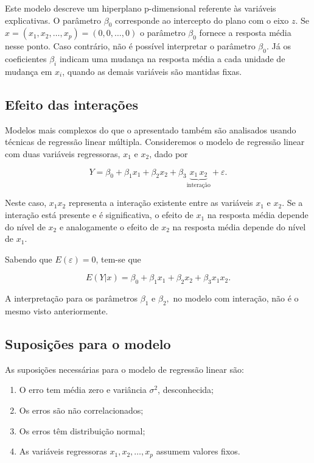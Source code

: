 \documentclass[
]{book}
\begin{document}
Este modelo descreve um hiperplano p-dimensional referente às variáveis explicativas. O parâmetro \(\beta_0\) corresponde ao intercepto do plano com o eixo \(z\). Se \(x=(x_1, x_2,\ldots,x_p)=(0,0,\ldots,0)\) o parâmetro \(\beta_0\) fornece a resposta média nesse ponto. Caso contrário, não é possível interpretar o parâmetro \(\beta_0\). Já os coeficientes \(\beta_i\) indicam uma mudança na resposta média a cada unidade de mudança em \(x_i\), quando as demais variáveis são mantidas fixas.

\hypertarget{efeito-das-interauxe7uxf5es}{%
\subsection{Efeito das interações}\label{efeito-das-interauxe7uxf5es}}

Modelos mais complexos do que o apresentado também são analisados usando técnicas de regressão linear múltipla. Consideremos o modelo de regressão linear com duas variáveis regressoras, \(x_1\) e \(x_2\), dado por

\[Y=\beta_0+\beta_1 x_{1}+\beta_2 x_{2}+\beta_{3}\underbrace{x_{1}\,x_{2}}_{\mbox{interação}} + \varepsilon.\]

Neste caso, \(x_1x_2\) representa a interação existente entre as variáveis \(x_1\) e \(x_2\). Se a interação está presente e é significativa, o efeito de \(x_{1}\) na resposta média depende do nível de \(x_2\) e analogamente o efeito de \(x_2\) na resposta média depende do nível de \(x_{1}\).

Sabendo que \(E(\varepsilon)=0\), tem-se que

\[E(Y|x)=\beta_0+\beta_1x_1+\beta_2x_2+\beta_3x_1x_2.\]

A interpretação para os parâmetros \(\beta_1\) e \(\beta_2,\) no modelo com interação, não é o mesmo visto anteriormente.

\hypertarget{suposiuxe7uxf5es-para-o-modelo}{%
\subsection{Suposições para o modelo}\label{suposiuxe7uxf5es-para-o-modelo}}

As suposições necessárias para o modelo de regressão linear são:

\begin{enumerate}
\def\labelenumi{\roman{enumi})}
\item
  O erro tem média zero e variância \(\sigma^2\), desconhecida;
\item
  Os erros são não correlacionados;
\item
  Os erros têm distribuição normal;
\item
  As variáveis regressoras \(x_{1}, x_{2}, \ldots, x_{p}\) assumem valores fixos.
\end{enumerate}
\end{document}
